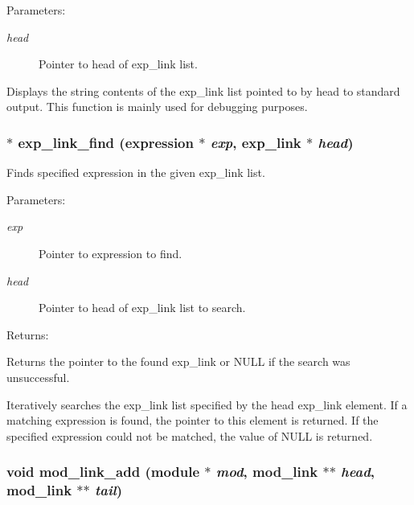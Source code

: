 \begin{Desc}
\item[Parameters: ]\par
\begin{description}
\item[{\em 
head}]Pointer to head of exp\_\-link list.\end{description}
\end{Desc}
Displays the string contents of the exp\_\-link list pointed to by head to standard output. This function is mainly used for debugging purposes. 
\subsubsection{$\ast$ exp\_\-link\_\-find ({\bf expression} $\ast$ {\em exp}, {\bf exp\_\-link} $\ast$ {\em head})}\label{link_8h_a12}


Finds specified expression in the given exp\_\-link list.

\begin{Desc}
\item[Parameters: ]\par
\begin{description}
\item[{\em 
exp}]Pointer to expression to find. \item[{\em 
head}]Pointer to head of exp\_\-link list to search.\end{description}
\end{Desc}
\begin{Desc}
\item[Returns: ]\par
Returns the pointer to the found exp\_\-link or NULL if the search was unsuccessful.\end{Desc}
Iteratively searches the exp\_\-link list specified by the head exp\_\-link element. If a matching expression is found, the pointer to this element is returned. If the specified expression could not be matched, the value of NULL is returned. 
\subsubsection{\setlength{\rightskip}{0pt plus 5cm}void mod\_\-link\_\-add ({\bf module} $\ast$ {\em mod}, {\bf mod\_\-link} $\ast$$\ast$ {\em head}, {\bf mod\_\-link} $\ast$$\ast$ {\em tail})}\label{link_8h_a4}


